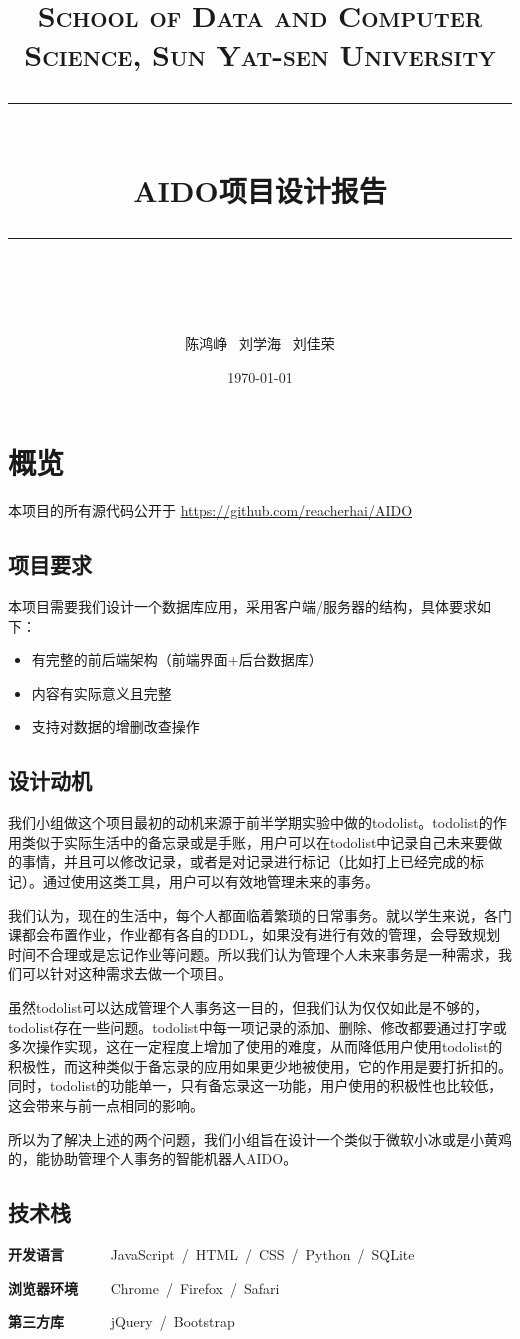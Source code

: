 \documentclass[a4paper, 11pt]{article}
\title{	
\normalfont \normalsize
\textsc{School of Data and Computer Science, Sun Yat-sen University} \\ [25pt] %
\rule{\textwidth}{0.5pt} \\[0.4cm] %
\huge  AIDO项目设计报告 \\ %
\rule{\textwidth}{2pt} \\[0.5cm] %
\author{陈鸿峥 \ 刘学海 \ 刘佳荣}
\date{\normalsize\today}
}
\begin{document}
\maketitle

\newpage
\section{概览}
本项目的所有源代码公开于 \url{https://github.com/reacherhai/AIDO}

\subsection{项目要求}
本项目需要我们设计一个数据库应用，采用客户端/服务器的结构，具体要求如下：
\begin{itemize}
\item 有完整的前后端架构（前端界面+后台数据库）
\item 内容有实际意义且完整
\item 支持对数据的增删改查操作
\end{itemize}

\subsection{设计动机}
\par 我们小组做这个项目最初的动机来源于前半学期实验中做的todolist。todolist的作用类似于实际生活中的备忘录或是手账，用户可以在todolist中记录自己未来要做的事情，并且可以修改记录，或者是对记录进行标记（比如打上已经完成的标记）。通过使用这类工具，用户可以有效地管理未来的事务。
\par 我们认为，现在的生活中，每个人都面临着繁琐的日常事务。就以学生来说，各门课都会布置作业，作业都有各自的DDL，如果没有进行有效的管理，会导致规划时间不合理或是忘记作业等问题。所以我们认为管理个人未来事务是一种需求，我们可以针对这种需求去做一个项目。
\par 虽然todolist可以达成管理个人事务这一目的，但我们认为仅仅如此是不够的，todolist存在一些问题。todolist中每一项记录的添加、删除、修改都要通过打字或多次操作实现，这在一定程度上增加了使用的难度，从而降低用户使用todolist的积极性，而这种类似于备忘录的应用如果更少地被使用，它的作用是要打折扣的。同时，todolist的功能单一，只有备忘录这一功能，用户使用的积极性也比较低，这会带来与前一点相同的影响。
\par 所以为了解决上述的两个问题，我们小组旨在设计一个类似于微软小冰或是小黄鸡的，能协助管理个人事务的智能机器人AIDO。

\subsection{技术栈} %
\par \textbf{开发语言} \ \ \ \ \ \ JavaScript\ /\ HTML\ /\ CSS\ /\ Python\ /\ SQLite
\par \textbf{浏览器环境} \ \ \ \ Chrome\ /\ Firefox\ /\ Safari
\par \textbf{第三方库}  \ \ \ \ \ \ jQuery\ /\ Bootstrap
\end{document}
